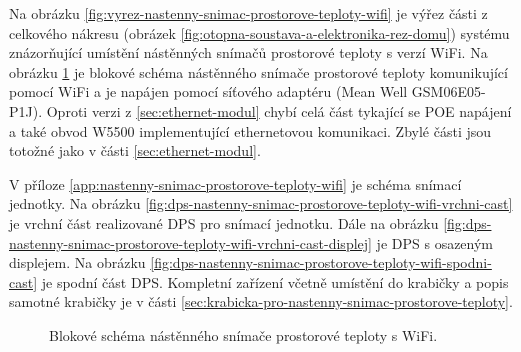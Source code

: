 Na obrázku \ref{fig:vyrez-nastenny-snimac-prostorove-teploty-wifi} je výřez části z celkového nákresu (obrázek \ref{fig:otopna-soustava-a-elektronika-rez-domu}) systému znázorňující umístění nástěnných snímačů prostorové teploty s verzí WiFi. Na obrázku \ref{fig:blokove-schema-nastenny-snimac-teploty-wifi} je blokové schéma nástěnného snímače prostorové teploty komunikující pomocí WiFi a je napájen pomocí síťového adaptéru (Mean Well GSM06E05-P1J). Oproti verzi z \ref{sec:ethernet-modul} chybí celá část tykající se POE napájení a také obvod W5500 implementující ethernetovou komunikaci. Zbylé části jsou totožné jako v části \ref{sec:ethernet-modul}.

V příloze \ref{app:nastenny-snimac-prostorove-teploty-wifi} je schéma snímací jednotky. Na obrázku \ref{fig:dps-nastenny-snimac-prostorove-teploty-wifi-vrchni-cast} je vrchní část realizované DPS pro snímací jednotku. Dále na obrázku \ref{fig:dps-nastenny-snimac-prostorove-teploty-wifi-vrchni-cast-displej} je DPS s osazeným displejem. Na obrázku \ref{fig:dps-nastenny-snimac-prostorove-teploty-wifi-spodni-cast} je spodní část DPS. Kompletní zařízení včetně umístění do krabičky a popis samotné krabičky je v části \ref{sec:krabicka-pro-nastenny-snimac-prostorove-teploty}.

\begin{figure}[H]
    \centering
    \def\svgwidth{\columnwidth}
    
    \caption[]{Blokové schéma nástěnného snímače prostorové teploty s WiFi.}
    \label{fig:blokove-schema-nastenny-snimac-teploty-wifi}
\end{figure}


